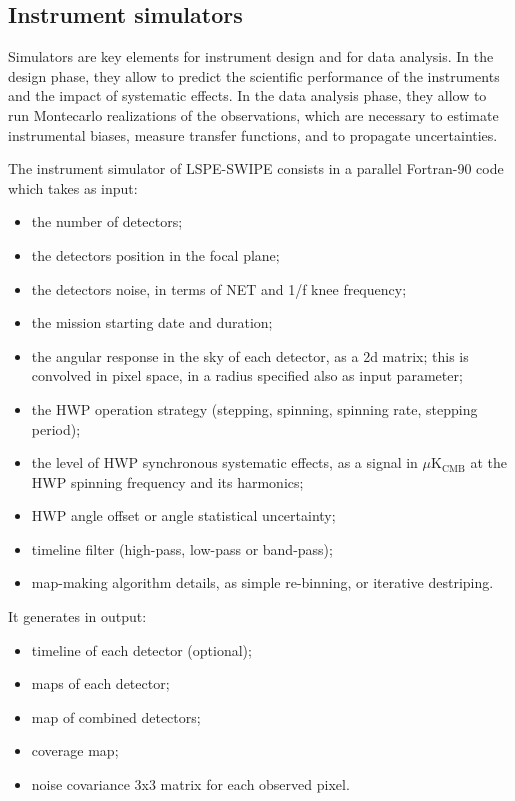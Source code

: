 \subsection{Instrument simulators}
Simulators are key elements for instrument design and for data analysis. 
In the design phase, they allow to predict the scientific performance of the 
instruments and the impact of systematic effects. In the data analysis phase, 
they allow to run Montecarlo realizations of the observations, which are 
necessary to estimate instrumental biases, measure transfer functions, 
and to propagate uncertainties. 

The instrument simulator of LSPE-SWIPE consists in a parallel Fortran-90 code
which takes as input:
\begin{itemize} 
\item the number of detectors;
\item the detectors position in the focal plane; 
\item the detectors noise, in terms of NET and 1/f knee frequency;
\item the mission starting date and duration;
\item the angular response in the sky of each detector, as a 2d matrix; this
is convolved in pixel space, in a radius specified also as input parameter;
\item the HWP operation strategy (stepping, spinning, spinning rate, stepping period);
\item the level of HWP synchronous systematic effects, as a signal in $\mu$K$_\text{CMB}$
at the HWP spinning frequency and its harmonics;
\item HWP angle offset or angle statistical uncertainty;
\item timeline filter (high-pass, low-pass or band-pass);
\item map-making algorithm details, as simple re-binning, or iterative
destriping.
\end{itemize}
It generates in output:
\begin{itemize} 
\item timeline of each detector (optional);
\item maps of each detector;
\item map of combined detectors;
\item coverage map;
\item noise covariance 3x3 matrix for each observed pixel.
\end{itemize}

